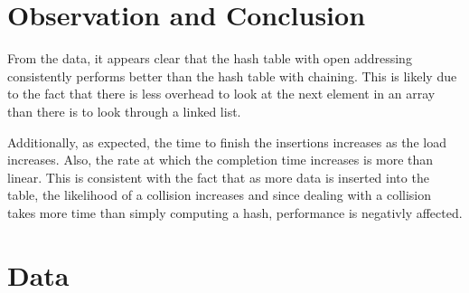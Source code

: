 \documentclass{article}
\begin{document}
\section{Observation and Conclusion}

From the data, it appears clear that the hash table with open addressing consistently performs better than the hash table with chaining.  This is likely due to the fact that there is less overhead to look at the next element in an array than there is to look through a linked list.

Additionally, as expected, the time to finish the insertions increases as the load increases.  Also, the rate at which the completion time increases is more than linear.  This is consistent with the fact that as more data is inserted into the table, the likelihood of a collision increases and since dealing with a collision takes more time than simply computing a hash, performance is negativly affected.




\section{Data}
\end{document}
